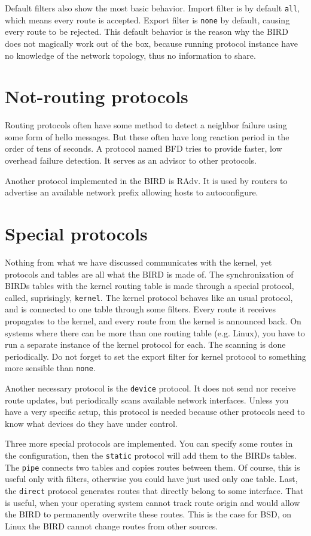 Default filters also show the most basic behavior. Import filter is by default
\texttt{all}, which means every route is accepted. Export filter is
\texttt{none} by default, causing every route to be rejected. This default
behavior is the reason why the BIRD does not magically work out of the box,
because running protocol instance have no knowledge of the network topology,
thus no information to share.

\section{Not-routing protocols}
Routing protocols often have some method to detect a neighbor failure using
some form of hello messages. But these often have long reaction period in the
order of tens of seconds. A protocol named BFD tries to provide faster, low
overhead failure detection. It serves as an advisor to other protocols.

Another protocol implemented in the BIRD is RAdv. It is used by routers to
advertise an available network prefix allowing hosts to autoconfigure.

\section{Special protocols}
Nothing from what we have discussed communicates with the kernel, yet protocols
and tables are all what the BIRD is made of. The synchronization of BIRDs
tables with the kernel routing table is made through a special protocol,
called, suprisingly, \texttt{kernel}. The kernel protocol behaves like an usual
protocol, and is connected to one table through some filters. Every route it
receives propagates to the kernel, and every route from the kernel is announced
back. On systems where there can be more than one routing table (e.g. Linux),
you have to run a separate instance of the kernel protocol for each. The
scanning is done periodically. Do not forget to set the export filter for
kernel protocol to something more sensible than \texttt{none}.

Another necessary protocol is the \texttt{device} protocol. It does not send
nor receive route updates, but periodically scans available network interfaces.
Unless you have a very specific setup, this protocol is needed because other
protocols need to know what devices do they have under control.

Three more special protocols are implemented. You can specify some routes in
the configuration, then the \texttt{static} protocol will add them to the BIRDs
tables. The \texttt{pipe} connects two tables and copies routes between
them. Of course, this is useful only with filters, otherwise you could have
just used only one table. Last, the \texttt{direct} protocol generates routes
that directly belong to some interface. That is useful, when your operating
system cannot track route origin and would allow the BIRD to permanently
overwrite these routes. This is the case for BSD, on Linux the BIRD cannot
change routes from other sources.

